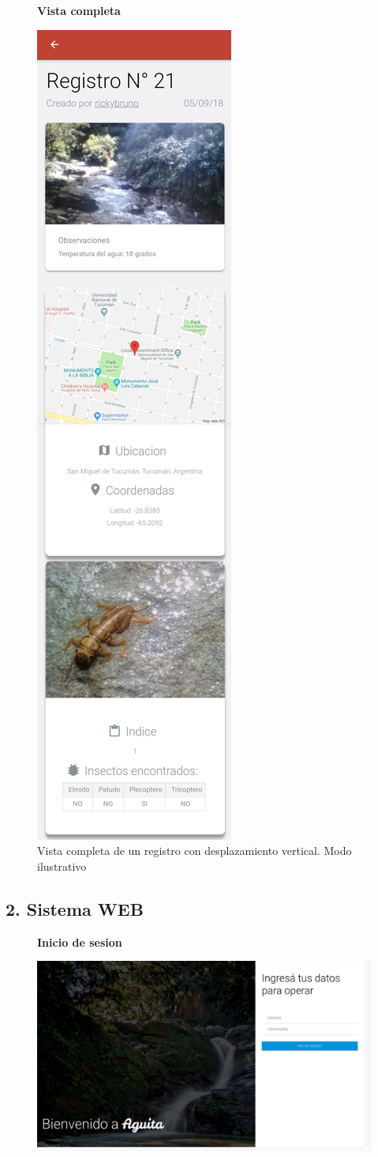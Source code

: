 				\begin{figure}[H]
					\centering
					\textbf{Vista completa}\par\medskip
						\includegraphics[height=1.2\textwidth]{Screenshots/verRegistroCompleto.png}
						\caption{Vista completa de un registro con desplazamiento vertical. Modo ilustrativo}
				\end{figure}

			\subsection{2. Sistema WEB}

				\begin{figure}[H]
					\hspace*{1cm}\raggedright\large\textbf{Inicio de sesion}\par\medskip
					\centering
						\includegraphics[width=1\textwidth]{Screenshots/web/login.png}
				\end{figure} 
	
